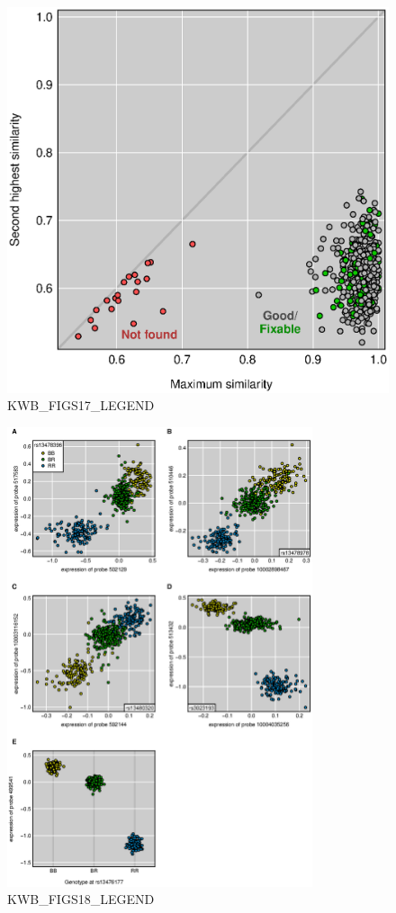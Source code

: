 \documentclass[letterpaper,twoside]{article}
\begin{document}
\begin{figure}[p]
\centerline{\includegraphics[width=4.5in]{SuppFigs/figS17.eps}}

\caption{KWB_FIGS17_LEGEND}
\end{figure}


\clearpage




\begin{figure}[p]
\centerline{\includegraphics[width=0.8\textwidth]{SuppFigs/figS18.eps}}

\caption{KWB_FIGS18_LEGEND}
\end{figure}
\end{document}
